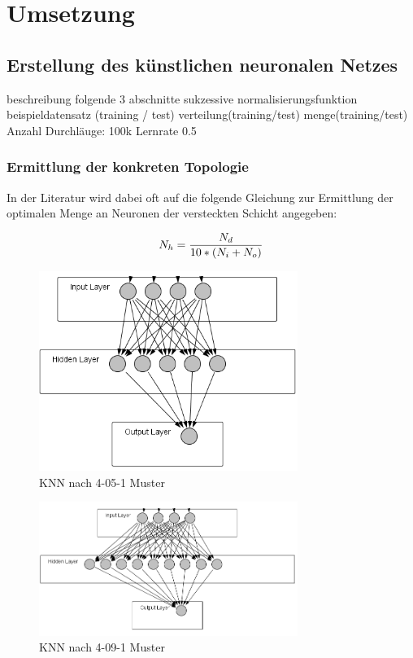 \chapter{Umsetzung} %
\section{Erstellung des künstlichen neuronalen Netzes} %

beschreibung folgende 3 abschnitte sukzessive
normalisierungsfunktion
beispieldatensatz (training / test)
verteilung(training/test)
menge(training/test)
Anzahl Durchläuge: 100k
Lernrate 0.5


\subsection{Ermittlung der konkreten Topologie} %
In der Literatur wird dabei oft auf die folgende Gleichung zur Ermittlung der optimalen  Menge an Neuronen der versteckten Schicht angegeben:

\begin{equation}\formelentry{Optimale Anzahl Neuronen in der versteckten Schicht}
  N_h = \frac{N_d}{10*(N_i+N_o)}
\end{equation}


\begin{figure}[htbp]
\centering
		\includegraphics[width=0.75\textwidth]{4-5-1.PNG}
	\caption{KNN nach 4-05-1 Muster}
	\label{fig:KNN nach 4-05-1 Muster}
\end{figure}


\begin{figure}[H]
\centering
		\includegraphics[width=0.75\textwidth]{4-9-1.PNG}
	\caption{KNN nach 4-09-1 Muster}
	\label{fig:KNN nach 4-09-1 Muster}
\end{figure}



